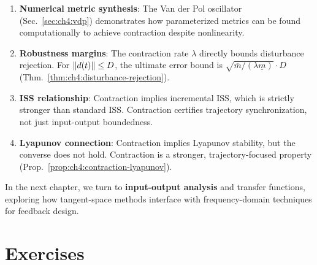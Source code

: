 \begin{enumerate}
\item \textbf{Numerical metric synthesis}: The Van der Pol oscillator (Sec.~\ref{sec:ch4:vdp})
      demonstrates how parameterized metrics can be found computationally to achieve
      contraction despite nonlinearity.

\item \textbf{Robustness margins}: The contraction rate $\lambda$ directly bounds
      disturbance rejection. For $\left\lVert d(t) \right\rVert \leq D$, the ultimate error bound
      is $\sqrt{\overline{m}/({\lambda\underline{m}})} \cdot D$ (Thm.~\ref{thm:ch4:disturbance-rejection}).

\item \textbf{ISS relationship}: Contraction implies incremental ISS, which is strictly
      stronger than standard ISS. Contraction certifies trajectory synchronization, not
      just input-output boundedness.

\item \textbf{Lyapunov connection}: Contraction implies Lyapunov stability, but the
      converse does not hold. Contraction is a stronger, trajectory-focused property
      (Prop.~\ref{prop:ch4:contraction-lyapunov}).
\end{enumerate}

In the next chapter, we turn to \textbf{input-output analysis} and transfer functions,
exploring how tangent-space methods interface with frequency-domain techniques for
feedback design.

\section*{Exercises}

